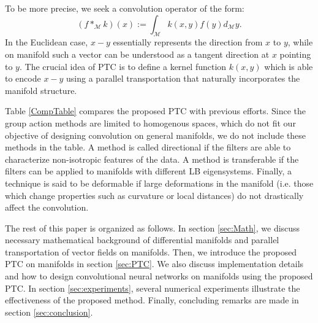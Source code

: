 \documentclass[10pt,twocolumn,letterpaper]{article}
\def\M{\mathcal{M}}
\begin{document}
To be more precise, we seek a convolution operator of the form:
\begin{equation}\label{ManConv}
(f *_{\M} k) (x) := \int_{\M} k(x,y)f(y) d_{\M}y.
\end{equation}
In the Euclidean case, $x-y$ essentially represents the direction from $x$ to $y$, while on manifold such a vector can be understood as a tangent direction at $x$ pointing to $y$. The crucial idea of PTC is to define a kernel function $k(x,y)$ which is able to encode $x-y$ using a parallel transportation that naturally incorporates the manifold structure.

Table \ref{CompTable} compares the proposed PTC with previous efforts. Since the group action methods are limited to homogenous spaces, which do not fit our objective of designing convolution on general manifolds, we do not include these methods in the table. A method is called directional if the filters are able to characterize non-isotropic features of the data. A method is transferable if the filters can be applied to manifolds with different LB eigensystems. Finally, a technique is said to be deformable if large deformations in the manifold (i.e. those which change properties such as curvature or local distances) do not drastically affect the convolution.


The rest of this paper is organized as follows. In section \ref{sec:Math}, we discuss necessary mathematical background of differential manifolds and parallel transportation of vector fields on manifolds. Then, we introduce the proposed PTC on manifolds in section \ref{sec:PTC}. We also discuss implementation details and how to design convolutional neural networks on manifolds using the proposed PTC. In section \ref{sec:experiments}, several numerical experiments illustrate the effectiveness of the proposed method. Finally, concluding remarks are made in section \ref{sec:conclusion}.
\end{document}
